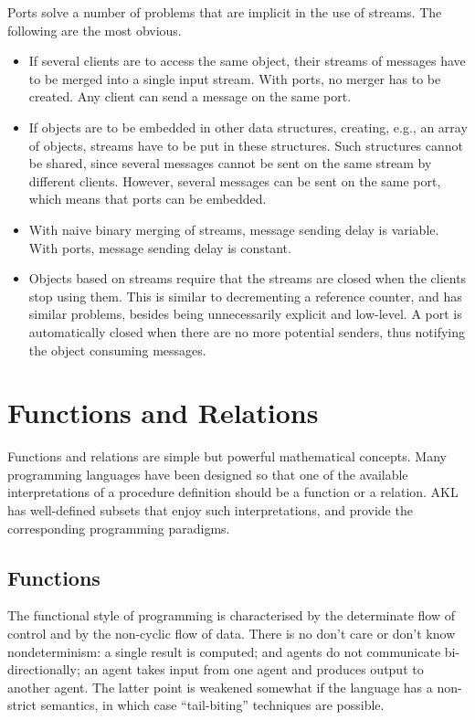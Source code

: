 Ports solve a number of problems that are implicit in the use of
streams.  The following are the most obvious.
%
\begin{itemize}
\item
If several clients are to access the same object, their streams of
messages have to be merged into a single input stream.  With ports, no
merger has to be created.  Any client can send a message on the same
port.
\item
If objects are to be embedded in other data structures, creating,
e.g., an array of objects, streams have to be put in these structures.
Such structures cannot be shared, since several messages cannot be
sent on the same stream by different clients.  However, several
messages can be sent on the same port, which means that ports can be
embedded.
\item
With naive binary merging of streams, message sending delay is
variable.  With ports, message sending delay is constant.
\item
Objects based on streams require that the streams are closed when the 
clients stop using them.  This is similar to decrementing a reference 
counter, and has similar problems, besides being unnecessarily explicit 
and low-level.  A port is automatically closed when there are no more 
potential senders, thus notifying the object consuming messages.
\end{itemize}

\section{Functions and Relations}

Functions and relations are simple but powerful mathematical concepts.
Many programming languages have been designed so that one of the
available interpretations of a procedure definition should be a
function or a relation.  AKL has well-defined subsets that enjoy such
interpretations, and provide the corresponding programming paradigms.

\subsection{Functions}

The functional style of programming is characterised by the
determinate flow of control and by the non-cyclic flow of data.  There
is no don't care or don't know nondeterminism: a single result is
computed; and agents do not communicate bi-directionally; an agent
takes input from one agent and produces output to another agent.  The
latter point is weakened somewhat if the language has a non-strict
semantics, in which case ``tail-biting'' techniques are possible.


